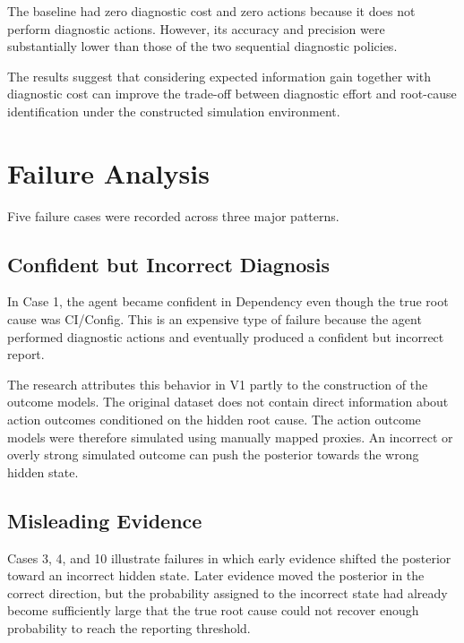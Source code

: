 \documentclass{article}
\begin{document}
The baseline had zero diagnostic cost and zero actions because it does not perform diagnostic actions. However, its accuracy and precision were substantially lower than those of the two sequential diagnostic policies.

The results suggest that considering expected information gain together with diagnostic cost can improve the trade-off between diagnostic effort and root-cause identification under the constructed simulation environment.

\section{Failure Analysis}

Five failure cases were recorded across three major patterns.

\subsection{Confident but Incorrect Diagnosis}

In Case 1, the agent became confident in Dependency even though the true root cause was CI/Config. This is an expensive type of failure because the agent performed diagnostic actions and eventually produced a confident but incorrect report.

The research attributes this behavior in V1 partly to the construction of the outcome models. The original dataset does not contain direct information about action outcomes conditioned on the hidden root cause. The action outcome models were therefore simulated using manually mapped proxies. An incorrect or overly strong simulated outcome can push the posterior towards the wrong hidden state.

\subsection{Misleading Evidence}

Cases 3, 4, and 10 illustrate failures in which early evidence shifted the posterior toward an incorrect hidden state. Later evidence moved the posterior in the correct direction, but the probability assigned to the incorrect state had already become sufficiently large that the true root cause could not recover enough probability to reach the reporting threshold.
\end{document}

